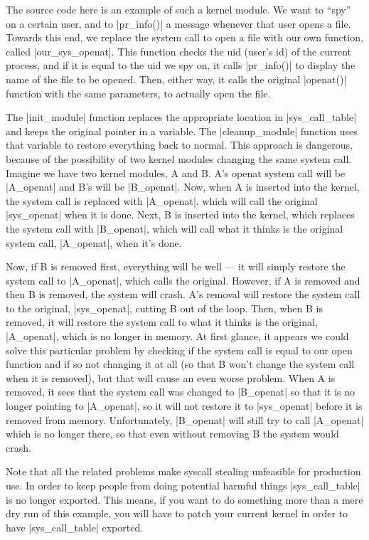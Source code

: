 \documentclass[10pt, oneside]{book}
\begin{document}
The source code here is an example of such a kernel module.
We want to ``spy'' on a certain user, and to \cpp|pr_info()| a message whenever that user opens a file.
Towards this end, we replace the system call to open a file with our own function, called \cpp|our_sys_openat|.
This function checks the uid (user's id) of the current process, and if it is equal to the uid we spy on, it calls \cpp|pr_info()| to display the name of the file to be opened.
Then, either way, it calls the original \cpp|openat()| function with the same parameters, to actually open the file.

The \cpp|init_module| function replaces the appropriate location in \cpp|sys_call_table| and keeps the original pointer in a variable.
The \cpp|cleanup_module| function uses that variable to restore everything back to normal.
This approach is dangerous, because of the possibility of two kernel modules changing the same system call.
Imagine we have two kernel modules, A and B. A's openat system call will be \cpp|A_openat| and B's will be \cpp|B_openat|.
Now, when A is inserted into the kernel, the system call is replaced with \cpp|A_openat|, which will call the original \cpp|sys_openat| when it is done.
Next, B is inserted into the kernel, which replaces the system call with \cpp|B_openat|, which will call what it thinks is the original system call, \cpp|A_openat|, when it's done.

Now, if B is removed first, everything will be well --- it will simply restore the system call to \cpp|A_openat|, which calls the original.
However, if A is removed and then B is removed, the system will crash.
A's removal will restore the system call to the original, \cpp|sys_openat|, cutting B out of the loop.
Then, when B is removed, it will restore the system call to what it thinks is the original, \cpp|A_openat|, which is no longer in memory.
At first glance, it appears we could solve this particular problem by checking if the system call is equal to our open function and if so not changing it at all (so that B won't change the system call when it is removed), but that will cause an even worse problem.
When A is removed, it sees that the system call was changed to \cpp|B_openat| so that it is no longer pointing to \cpp|A_openat|, so it will not restore it to \cpp|sys_openat| before it is removed from memory.
Unfortunately, \cpp|B_openat| will still try to call \cpp|A_openat| which is no longer there, so that even without removing B the system would crash.

Note that all the related problems make syscall stealing unfeasible for production use.
In order to keep people from doing potential harmful things \cpp|sys_call_table| is no longer exported.
This means, if you want to do something more than a mere dry run of this example, you will have to patch your current kernel in order to have \cpp|sys_call_table| exported.
\end{document}
